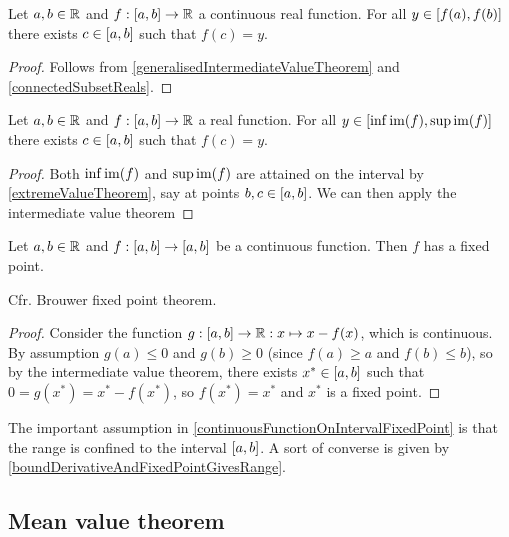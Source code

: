 \begin{proposition} \label{intermediateValueTheorem}
Let $a,b\in \mathbb{R}$ and $f:\interval{a,b}\to \R$ a continuous real function. For all $y\in \interval{f(a), f(b)}$ there exists $c\in \interval{a,b}$ such that $f(c) = y$.
\end{proposition}
\begin{proof}
Follows from \ref{generalisedIntermediateValueTheorem} and \ref{connectedSubsetReals}.
\end{proof}
\begin{corollary} \label{extremaIntermediateValueTheorem}
Let $a,b\in \mathbb{R}$ and $f:\interval{a,b}\to \R$ a real function. For all $y\in \interval{\inf\im(f), \sup\im(f)}$ there exists $c\in \interval{a,b}$ such that $f(c) = y$.
\end{corollary}
\begin{proof}
Both $\inf\operatorname{im}(f)$ and $\sup\operatorname{im}(f)$ are attained on the interval by \ref{extremeValueTheorem}, say at points $b,c\in \interval{a,b}$. We can then apply the intermediate value theorem 
\end{proof}
\begin{corollary} \label{continuousFunctionOnIntervalFixedPoint}
Let $a,b\in \mathbb{R}$ and $f:\interval{a,b}\to \interval{a,b}$ be a continuous function. Then $f$ has a fixed point.
\end{corollary}
Cfr. Brouwer fixed point theorem.
\begin{proof}
Consider the function $g: \interval{a,b} \to \R: x\mapsto x - f(x)$, which is continuous. By assumption $g(a) \leq 0$ and $g(b)\geq 0$ (since $f(a) \geq a$ and $f(b)\leq b$), so by the intermediate value theorem, there exists $x^* \in \interval{a,b}$ such that $0 = g(x^*) = x^* - f(x^*)$, so $f(x^*) = x^*$ and $x^*$ is a fixed point.
\end{proof}
The important assumption in \ref{continuousFunctionOnIntervalFixedPoint} is that the range is confined to the interval $\interval{a,b}$. A sort of converse is given by \ref{boundDerivativeAndFixedPointGivesRange}.

\subsection{Mean value theorem}

